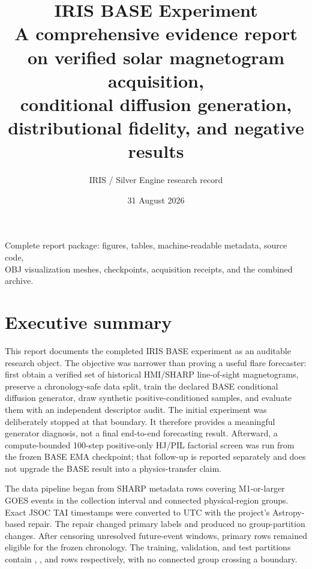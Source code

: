 \documentclass[11pt,oneside]{report}
\title{\textbf{IRIS BASE Experiment}\\[0.4em]
  \Large A comprehensive evidence report on verified solar magnetogram acquisition,\\
  conditional diffusion generation, distributional fidelity, and negative results}
\author{IRIS / Silver Engine research record}
\date{31 August 2026}
\begin{document}
\begin{titlepage}
\maketitle
\vfill
\begin{center}
\end{center}
\vfill
\begin{center}
\small Complete report package: figures, tables, machine-readable metadata, source code,\\
OBJ visualization meshes, checkpoints, acquisition receipts, and the combined archive.\\
\end{center}
\end{titlepage}

\chapter*{Executive summary}

This report documents the completed IRIS BASE experiment as an auditable research object. The objective was narrower than proving a useful flare forecaster: first obtain a verified set of historical HMI/SHARP line-of-sight magnetograms, preserve a chronology-safe data split, train the declared BASE conditional diffusion generator, draw synthetic positive-conditioned samples, and evaluate them with an independent descriptor audit. The initial experiment was deliberately stopped at that boundary. It therefore provides a meaningful generator diagnosis, not a final end-to-end forecasting result. Afterward, a compute-bounded 100-step positive-only HJ/PIL factorial screen was run from the frozen BASE EMA checkpoint; that follow-up is reported separately and does not upgrade the BASE result into a physics-transfer claim.

The data pipeline began from \ManifestCount{} SHARP metadata rows covering \MOneEvents{} M1-or-larger GOES events in the collection interval and \GroupCount{} connected physical-region groups. Exact JSOC TAI timestamps were converted to UTC with the project’s Astropy-based repair. The repair changed \TaiLabelChanges{} primary labels and produced no group-partition changes. After censoring unresolved future-event windows, \PrimaryCount{} primary rows remained eligible for the frozen chronology. The training, validation, and test partitions contain \TrainRows{}, \ValidationRows{}, and \TestRows{} rows respectively, with no connected group crossing a boundary.
\end{document}
